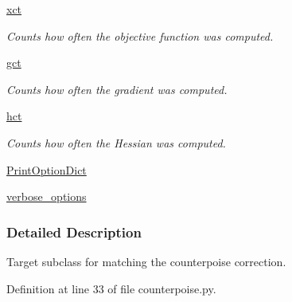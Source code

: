 \begin{DoxyCompactItemize}
\hyperlink{classforcebalance_1_1target_1_1Target_aad2e385cfbf7b4a68f1c2cb41133fe82}{xct}
\begin{DoxyCompactList}\small\item\em Counts how often the objective function was computed. \end{DoxyCompactList}\item 
\hyperlink{classforcebalance_1_1target_1_1Target_aa625ac88c6744eb14ef281d9496d0dbb}{gct}
\begin{DoxyCompactList}\small\item\em Counts how often the gradient was computed. \end{DoxyCompactList}\item 
\hyperlink{classforcebalance_1_1target_1_1Target_a5b5a42f78052b47f29ed4b940c6111a1}{hct}
\begin{DoxyCompactList}\small\item\em Counts how often the Hessian was computed. \end{DoxyCompactList}\item 
\hyperlink{classforcebalance_1_1BaseClass_afc6659278497d7245bc492ecf405ccae}{Print\-Option\-Dict}
\item 
\hyperlink{classforcebalance_1_1BaseClass_afd68efa29ccd2f320f4cf82198214aac}{verbose\-\_\-options}
\end{DoxyCompactItemize}


\subsubsection{Detailed Description}
Target subclass for matching the counterpoise correction. 



Definition at line 33 of file counterpoise.\-py.



